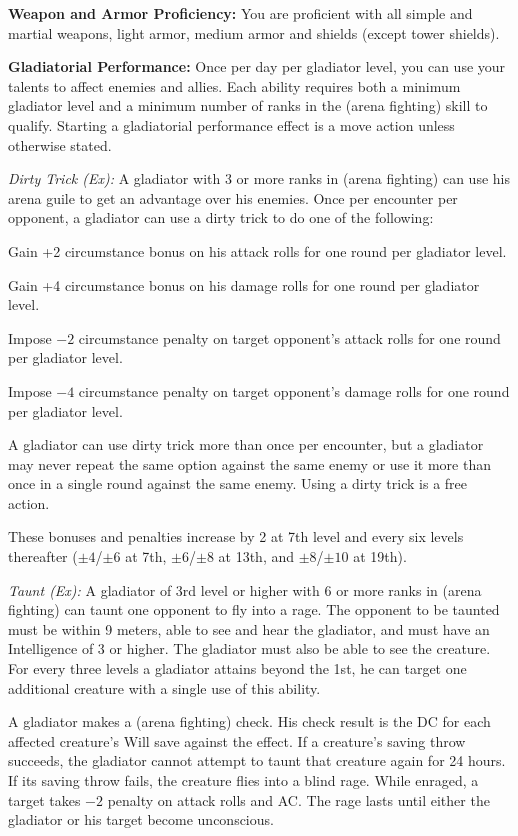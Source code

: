\textbf{Weapon and Armor Proficiency:} You are proficient with all simple and martial weapons, light armor, medium armor and shields (except tower shields).

\textbf{Gladiatorial Performance:} Once per day per gladiator level, you can use your talents to affect enemies and allies. Each ability requires both a minimum gladiator level and a minimum number of ranks in the  (arena fighting) skill to qualify. Starting a gladiatorial performance effect is a move action unless otherwise stated.

\textit{Dirty Trick (Ex):} A gladiator with 3 or more ranks in  (arena fighting) can use his arena guile to get an advantage over his enemies. Once per encounter per opponent, a gladiator can use a dirty trick to do one of the following:

\begin{itemize*}
\item Gain +2 circumstance bonus on his attack rolls for one round per gladiator level.
\item Gain +4 circumstance bonus on his damage rolls for one round per gladiator level.
\item Impose $-2$ circumstance penalty on target opponent's attack rolls for one round per gladiator level.
\item Impose $-4$ circumstance penalty on target opponent's damage rolls for one round per gladiator level.
\end{itemize*}

A gladiator can use dirty trick more than once per encounter, but a gladiator may never repeat the same option against the same enemy or use it more than once in a single round against the same enemy. Using a dirty trick is a free action.

These bonuses and penalties increase by 2 at 7th level and every six levels thereafter ($\pm4$/$\pm6$ at 7th, $\pm6$/$\pm8$ at 13th, and $\pm8$/$\pm10$ at 19th).

\textit{Taunt (Ex):} A gladiator of 3rd level or higher with 6 or more ranks in  (arena fighting) can taunt one opponent to fly into a rage. The opponent to be taunted must be within 9 meters, able to see and hear the gladiator, and must have an Intelligence of 3 or higher. The gladiator must also be able to see the creature. For every three levels a gladiator attains beyond the 1st, he can target one additional creature with a single use of this ability.

A gladiator makes a  (arena fighting) check. His check result is the DC for each affected creature's Will save against the effect. If a creature's saving throw succeeds, the gladiator cannot attempt to taunt that creature again for 24 hours. If its saving throw fails, the creature flies into a blind rage. While enraged, a target takes $-2$ penalty on attack rolls and AC. The rage lasts until either the gladiator or his target become unconscious.

